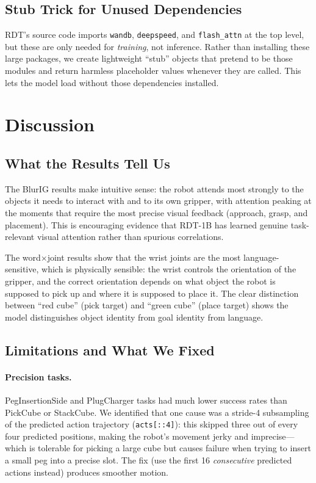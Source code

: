 \documentclass[11pt,a4paper]{article}
\begin{document}
\subsection{Stub Trick for Unused Dependencies}

RDT's source code imports \texttt{wandb}, \texttt{deepspeed}, and
\texttt{flash\_attn} at the top level, but these are only needed for
\emph{training}, not inference. Rather than installing these large packages,
we create lightweight ``stub'' objects that pretend to be those modules
and return harmless placeholder values whenever they are called.
This lets the model load without those dependencies installed.

\section{Discussion}

\subsection{What the Results Tell Us}

The BlurIG results make intuitive sense: the robot attends most strongly to
the objects it needs to interact with and to its own gripper, with attention
peaking at the moments that require the most precise visual feedback (approach,
grasp, and placement). This is encouraging evidence that RDT-1B has learned
genuine task-relevant visual attention rather than spurious correlations.

The word$\times$joint results show that the wrist joints are the most
language-sensitive, which is physically sensible: the wrist controls the
orientation of the gripper, and the correct orientation depends on what
object the robot is supposed to pick up and where it is supposed to place it.
The clear distinction between ``red cube'' (pick target) and ``green cube''
(place target) shows the model distinguishes object identity from goal identity
from language.

\subsection{Limitations and What We Fixed}

\paragraph{Precision tasks.}
PegInsertionSide and PlugCharger tasks had much lower success rates than
PickCube or StackCube. We identified that one cause was a stride-4
subsampling of the predicted action trajectory (\texttt{acts[::4]}):
this skipped three out of every four predicted positions, making the
robot's movement jerky and imprecise---which is tolerable for picking a
large cube but causes failure when trying to insert a small peg into a
precise slot. The fix (use the first 16 \emph{consecutive} predicted
actions instead) produces smoother motion.
\end{document}
